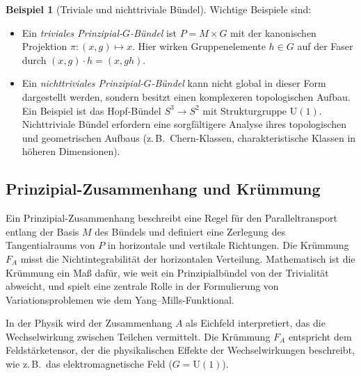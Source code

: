\documentclass[10pt, letterpaper]{article}
\theoremstyle{custom}
\theoremstyle{definition}
\newtheorem{example}[theorem]{Beispiel}
\begin{document}
\begin{example}[Triviale und nichttriviale Bündel] Wichtige Beispiele sind:
\begin{itemize}[leftmargin=1.2em]
  \item Ein \emph{triviales Prinzipial-\(G\)-Bündel} ist \(P = M \times G\) mit der kanonischen Projektion \(\pi: (x, g) \mapsto x\). Hier wirken Gruppenelemente \(h \in G\) auf der Faser durch \((x, g) \cdot h = (x, gh)\).
  \item Ein \emph{nichttriviales Prinzipial-\(G\)-Bündel} kann nicht global in dieser Form dargestellt werden, sondern besitzt einen komplexeren topologischen Aufbau. Ein Beispiel ist das Hopf-Bündel \(S^3 \to S^2\) mit Strukturgruppe \(\mathrm{U}(1)\). Nichttriviale Bündel erfordern eine sorgfältigere Analyse ihres topologischen und geometrischen Aufbaus (z.\,B.\ Chern-Klassen, charakteristische Klassen in höheren Dimensionen).
\end{itemize}
\end{example}

\subsection{Prinzipial-Zusammenhang und Krümmung}

Ein Prinzipial-Zusammenhang beschreibt eine Regel für den Paralleltransport entlang der Basis \(M\) des Bündels und definiert eine Zerlegung des Tangentialraums von \(P\) in horizontale und vertikale Richtungen. Die Krümmung \(F_A\) misst die Nichtintegrabilität der horizontalen Verteilung. Mathematisch ist die Krümmung ein Maß dafür, wie weit ein Prinzipialbündel von der Trivialität abweicht, und spielt eine zentrale Rolle in der Formulierung von Variationsproblemen wie dem Yang--Mills-Funktional.

In der Physik wird der Zusammenhang \(A\) als Eichfeld interpretiert, das die Wechselwirkung zwischen Teilchen vermittelt. Die Krümmung \(F_A\) entspricht dem Feldstärketensor, der die physikalischen Effekte der Wechselwirkungen beschreibt, wie z.\,B.\ das elektromagnetische Feld (\(G = \mathrm{U}(1)\)).
\end{document}
